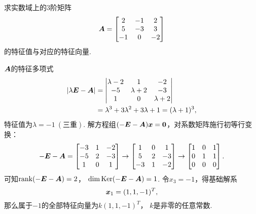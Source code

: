 \begin{example}
求实数域上的3阶矩阵\begin{equation*}
	\boldsymbol{A} = \begin{bmatrix}
		2 & -1 & 2 \\
		5 & -3 & 3 \\
		-1 & 0 & -2
	\end{bmatrix}
\end{equation*}的特征值与对应的特征向量.
\begin{solution}
\(\boldsymbol{A}\)的特征多项式\begin{align*}
	\abs{\lambda\boldsymbol{E}-\boldsymbol{A}}
	&= \begin{vmatrix}
		\lambda-2 & 1 & -2 \\
		-5 & \lambda+2 & -3 \\
		1 & 0 & \lambda+2
	\end{vmatrix} \\
	&= \lambda^3 + 3\lambda^2 + 3\lambda + 1
	= (\lambda+1)^3,
\end{align*}
特征值为\(\lambda=-1\ (\text{三重})\).
解方程组\((-\boldsymbol{E}-\boldsymbol{A})\boldsymbol{x} = \boldsymbol0\)，对系数矩阵施行初等行变换：\begin{equation*}
	-\boldsymbol{E}-\boldsymbol{A} = \begin{bmatrix}
		-3 & 1 & -2 \\
		-5 & 2 & -3 \\
		1 & 0 & 1
	\end{bmatrix} \to \begin{bmatrix}
		1 & 0 & 1 \\
		5 & 2 & -3 \\
		-3 & 1 & -2
	\end{bmatrix} \to \begin{bmatrix}
		1 & 0 & 1 \\
		0 & 1 & 1 \\
		0 & 0 & 0
	\end{bmatrix}.
\end{equation*}
可知\(\rank(-\boldsymbol{E}-\boldsymbol{A}) = 2\)，
\(\dim\operatorname{Ker}(-\boldsymbol{E}-\boldsymbol{A}) = 1\).
令\(x_3 = -1\)，得基础解系\begin{equation*}
	\boldsymbol{x}_1 = (1,1,-1)^T,
\end{equation*}
那么属于\(-1\)的全部特征向量为\(k (1,1,-1)^T\)，
\(k\)是非零的任意常数.
\end{solution}
\end{example}

